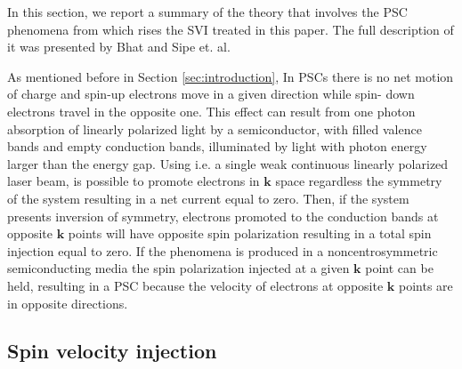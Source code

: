 \documentclass[prb,11pt,tightenlines,twocolumn,aps]{revtex4-1}
\begin{document}


In this section, we report a summary of the theory that involves the PSC
phenomena from which rises the SVI treated in this paper. The full description 
of it was presented by Bhat and Sipe et. al.\cite{bhatPRL05}
 
As mentioned before in Section \ref{sec:introduction}, In PSCs there is no net
motion of charge and spin-up electrons move in a given direction while spin-
down electrons travel in the opposite one. This effect can result from one
photon absorption of linearly polarized light by a semiconductor, with filled
valence bands and empty conduction bands, illuminated by light with photon
energy larger than the energy gap.
Using i.e. a single weak continuous linearly polarized laser beam, is possible
to promote electrons in $\mathbf{k}$ space regardless the symmetry of the
system resulting in a net current equal to zero. Then, if the system presents
inversion of symmetry, electrons promoted to the conduction bands at opposite
$\mathbf{k}$ points will have opposite spin polarization resulting in a total
spin injection equal to zero. If the phenomena is produced in a
noncentrosymmetric semiconducting media the spin polarization injected at a
given $\mathbf{k}$ point can be held\cite{alvaradoPRL85}, resulting in a PSC
because the velocity of electrons at opposite $\mathbf{k}$ points are in
opposite directions.

\subsection{Spin velocity injection} %
\label{sec:theory-pure_spin_current}
\end{document}
